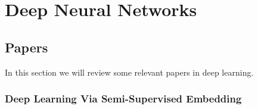 \chapter{Deep Neural Networks}


\section{Papers}

In this section we will review some relevant papers in deep learning.
\subsection{Deep Learning Via Semi-Supervised Embedding}

